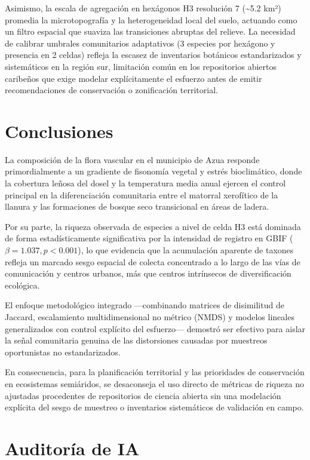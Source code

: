 \documentclass[
  12pt,
  man,
  floatsintext]{apa7}
\begin{document}
Asimismo, la escala de agregación en hexágonos H3 resolución 7 (\textasciitilde5.2 km²) promedia la microtopografía y la heterogeneidad local del suelo, actuando como un filtro espacial que suaviza las transiciones abruptas del relieve. La necesidad de calibrar umbrales comunitarios adaptativos (3 especies por hexágono y presencia en 2 celdas) refleja la escasez de inventarios botánicos estandarizados y sistemáticos en la región sur, limitación común en los repositorios abiertos caribeños que exige modelar explícitamente el esfuerzo antes de emitir recomendaciones de conservación o zonificación territorial.

\section{Conclusiones}\label{conclusiones}

La composición de la flora vascular en el municipio de Azua responde primordialmente a un gradiente de fisonomía vegetal y estrés bioclimático, donde la cobertura leñosa del dosel y la temperatura media anual ejercen el control principal en la diferenciación comunitaria entre el matorral xerofítico de la llanura y las formaciones de bosque seco transicional en áreas de ladera.

Por su parte, la riqueza observada de especies a nivel de celda H3 está dominada de forma estadísticamente significativa por la intensidad de registro en GBIF (\(\beta = 1.037, p < 0.001\)), lo que evidencia que la acumulación aparente de taxones refleja un marcado sesgo espacial de colecta concentrado a lo largo de las vías de comunicación y centros urbanos, más que centros intrínsecos de diversificación ecológica.

El enfoque metodológico integrado ---combinando matrices de disimilitud de Jaccard, escalamiento multidimensional no métrico (NMDS) y modelos lineales generalizados con control explícito del esfuerzo--- demostró ser efectivo para aislar la señal comunitaria genuina de las distorsiones causadas por muestreos oportunistas no estandarizados.

En consecuencia, para la planificación territorial y las prioridades de conservación en ecosistemas semiáridos, se desaconseja el uso directo de métricas de riqueza no ajustadas procedentes de repositorios de ciencia abierta sin una modelación explícita del sesgo de muestreo o inventarios sistemáticos de validación en campo.

\section{Auditoría de IA}\label{auditoruxeda-de-ia}
\end{document}
